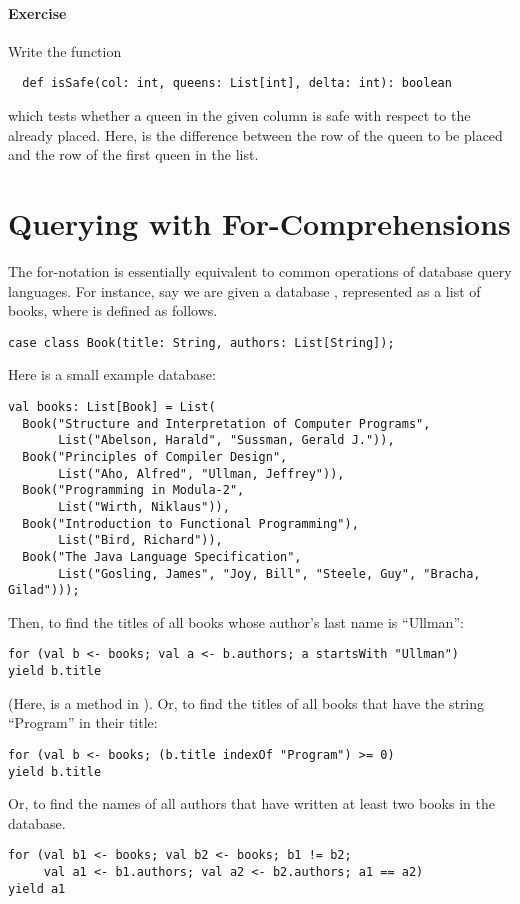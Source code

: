 \documentclass[a4paper,12pt,twoside,titlepage]{book}
\newcommand{\exercise}{\paragraph{Exercise}}
\begin{document}
\exercise Write the function
\begin{lstlisting}
  def isSafe(col: int, queens: List[int], delta: int): boolean
\end{lstlisting}
which tests whether a queen in the given column \verb@col@ is safe with 
respect to the \verb@queens@ already placed. Here, \verb@delta@ is the difference between the row of the queen to be
placed and the row of the first queen in the list.

\section{Querying with For-Comprehensions}

The for-notation is essentially equivalent to common operations of
database query languages.  For instance, say we are given a 
database , represented as a list of books, where
 is defined as follows.
\begin{lstlisting}
case class Book(title: String, authors: List[String]);
\end{lstlisting}
Here is a small example database:
\begin{lstlisting}
val books: List[Book] = List(
  Book("Structure and Interpretation of Computer Programs",
       List("Abelson, Harald", "Sussman, Gerald J.")),
  Book("Principles of Compiler Design",
       List("Aho, Alfred", "Ullman, Jeffrey")),
  Book("Programming in Modula-2",
       List("Wirth, Niklaus")),
  Book("Introduction to Functional Programming"),
       List("Bird, Richard")),
  Book("The Java Language Specification",
       List("Gosling, James", "Joy, Bill", "Steele, Guy", "Bracha, Gilad")));
\end{lstlisting}
Then, to find the titles of all books whose author's last name is ``Ullman'':
\begin{lstlisting}
for (val b <- books; val a <- b.authors; a startsWith "Ullman")
yield b.title
\end{lstlisting}
(Here,  is a method in ).  Or,
to find the titles of all books that have the string ``Program'' in
their title:
\begin{lstlisting}
for (val b <- books; (b.title indexOf "Program") >= 0)
yield b.title
\end{lstlisting}
Or, to find the names of all authors that have written at least two
books in the database.
\begin{lstlisting}
for (val b1 <- books; val b2 <- books; b1 != b2;
     val a1 <- b1.authors; val a2 <- b2.authors; a1 == a2)
yield a1
\end{lstlisting}
\end{document}
